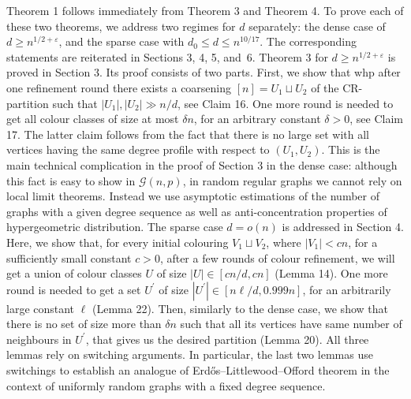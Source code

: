 \documentclass[10pt,a4paper]{article}
\begin{document}
Theorem 1 follows immediately from Theorem 3 and Theorem 4. To prove each of these two theorems, we address two regimes for $d$ separately: the dense case of $d\geq n^{1/2+\varepsilon}$, and the sparse case with $d_{0}\leq d\leq n^{10/17}$. The corresponding statements are reiterated in Sections 3, 4, 5, and 6.
Theorem 3 for $d\geq n^{1/2+\varepsilon}$ is proved in Section 3. Its proof consists of two parts. First, we show that whp after one refinement round there exists a coarsening $[n]=U_{1}\sqcup U_{2}$ of the CR-partition such that $|U_{1}|,|U_{2}|\gg n/d$, see Claim 16. One more round is needed to get all colour classes of size at most $\delta n$, for an arbitrary constant $\delta>0$, see Claim 17. The latter claim follows from the fact that there is no large set with all vertices having the same degree profile with respect to $(U_{1},U_{2})$. This is the main technical complication in the proof of Section 3 in the dense case: although this fact is easy to show in $\mathcal{G}(n,p)$, in random regular graphs we cannot rely on local limit theorems. Instead we use asymptotic estimations of the number of graphs with a given degree sequence as well as anti-concentration properties of hypergeometric distribution. The sparse case $d=o(n)$ is addressed in Section 4. Here, we show that, for every initial colouring $V_{1}\sqcup V_{2}$, where $|V_{1}|<cn$, for a sufficiently small constant $c>0$, after a few rounds of colour refinement, we will get a union of colour classes $U$ of size $|U|\in[cn/d,cn]$ (Lemma 14). One more round is needed to get a set $U^{\prime}$ of size $|U^{\prime}|\in[n\ell/d,0.999n]$, for an arbitrarily large constant $\ell$ (Lemma 22). Then, similarly to the dense case, we show that there is no set of size more than $\delta n$ such that all its vertices have same number of neighbours in $U^{\prime}$, that gives us the desired partition (Lemma 20). All three lemmas rely on switching arguments. In particular, the last two lemmas use switchings to establish an analogue of Erdős–Littlewood–Offord theorem in the context of uniformly random graphs with a fixed degree sequence.\par
\end{document}
